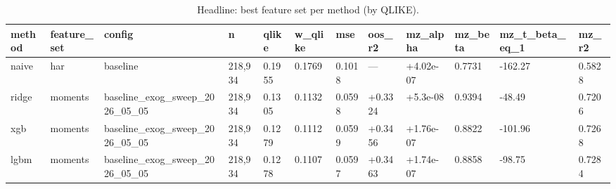 \begin{table}[t]
\centering
\caption{Headline: best feature set per method (by QLIKE).}
\label{tab:master_compact}
\begin{tabular}{llllllllllll}
\toprule
method & feature\_set & config & n & qlike & w\_qlike & mse & oos\_r2 & mz\_alpha & mz\_beta & mz\_t\_beta\_eq\_1 & mz\_r2 \\
\midrule
naive & har & baseline & 218,934 & 0.1955 & 0.1769 & 0.1018 & — & +4.02e-07 & 0.7731 & -162.27 & 0.5828 \\
ridge & moments & baseline\_exog\_sweep\_2026\_05\_05 & 218,934 & 0.1305 & 0.1132 & 0.0598 & +0.3324 & +5.3e-08 & 0.9394 & -48.49 & 0.7206 \\
xgb & moments & baseline\_exog\_sweep\_2026\_05\_05 & 218,934 & 0.1279 & 0.1112 & 0.0599 & +0.3456 & +1.76e-07 & 0.8822 & -101.96 & 0.7268 \\
lgbm & moments & baseline\_exog\_sweep\_2026\_05\_05 & 218,934 & 0.1278 & 0.1107 & 0.0597 & +0.3463 & +1.74e-07 & 0.8858 & -98.75 & 0.7284 \\
\bottomrule
\end{tabular}
\end{table}
